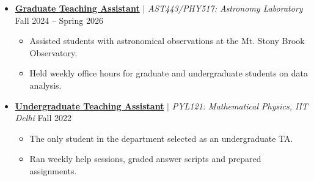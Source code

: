 \begin{itemize}[leftmargin=0.15in, label={}]
  \item \href{https://drive.google.com/file/d/1anb1oFf2TK0o_2Bdxb45pI-J-EMth8js/view?usp=sharing}{\textbf{Graduate Teaching Assistant}} $|$ \emph{AST443/PHY517: Astronomy Laboratory} \hfill Fall 2024 -- Spring 2026
  \begin{itemize}\small
    \item Assisted students with astronomical observations at the Mt. Stony Brook Observatory.
    \item Held weekly office hours for graduate and undergraduate students on data analysis.
  \end{itemize}
  \item \href{https://drive.google.com/file/d/1anb1oFf2TK0o_2Bdxb45pI-J-EMth8js/view?usp=sharing}{\textbf{Undergraduate Teaching Assistant}} $|$ \emph{PYL121: Mathematical Physics, IIT Delhi} \hfill Fall 2022
  \begin{itemize}\small
    \item The only student in the department selected as an undergraduate TA.
    \item Ran weekly help sessions, graded answer scripts and prepared assignments.
  \end{itemize}
\end{itemize}
